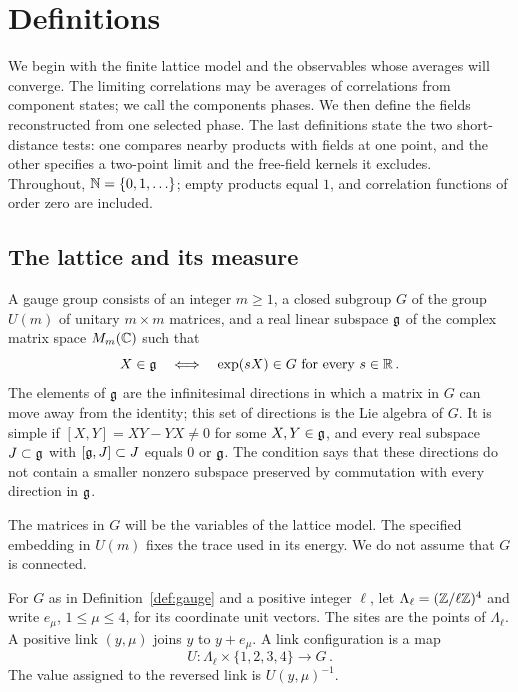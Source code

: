 \section{Definitions}\label{sec:definitions}

We begin with the finite lattice model and the observables whose averages will converge.
The limiting correlations may be averages of correlations from component states; we call the components phases.
We then define the fields reconstructed from one selected phase.
The last definitions state the two short-distance tests: one compares nearby products with fields at one point, and the other specifies a two-point limit and the free-field kernels it excludes.
Throughout, $\mathbb N=\{0,1,\ldots\}$; empty products equal $1$, and correlation functions of order zero are included.

\subsection{The lattice and its measure}\label{subsec:lattice-family}

\begin{definition}\label{def:gauge}
A gauge group consists of an integer $m\ge1$, a closed subgroup $G$ of the group $U(m)$ of unitary $m\times m$ matrices, and a real linear subspace $\mathfrak g$ of the complex matrix space $M_m(\mathbb C)$ such that
\begin{equation}\label{eq:gauge}
X\in\mathfrak g\quad\Longleftrightarrow\quad \exp(sX)\in G\text{ for every }s\in\mathbb R\,.
\end{equation}
The elements of $\mathfrak g$ are the infinitesimal directions in which a matrix in $G$ can move away from the identity; this set of directions is the Lie algebra of $G$.
It is simple if $[X,Y]=XY-YX\ne0$ for some $X,Y\in\mathfrak g$, and every real subspace $J\subset\mathfrak g$ with $[\mathfrak g,J]\subset J$ equals $0$ or $\mathfrak g$.
The condition says that these directions do not contain a smaller nonzero subspace preserved by commutation with every direction in $\mathfrak g$.
\end{definition}

The matrices in $G$ will be the variables of the lattice model.
The specified embedding in $U(m)$ fixes the trace used in its energy.
We do not assume that $G$ is connected.

\begin{definition}\label{def:lattice}
For $G$ as in Definition~\ref{def:gauge} and a positive integer $\ell$, let $\Lambda_\ell=(\mathbb Z/\ell\mathbb Z)^4$ and write $e_\mu$, $1\le\mu\le4$, for its coordinate unit vectors.
The sites are the points of $\Lambda_\ell$.
A positive link $(y,\mu)$ joins $y$ to $y+e_\mu$.
A link configuration is a map
\begin{equation}\label{eq:link-configuration}
U:\Lambda_\ell\times\{1,2,3,4\}\longrightarrow G\,.
\end{equation}
The value assigned to the reversed link is $U(y,\mu)^{-1}$.
\end{definition}

